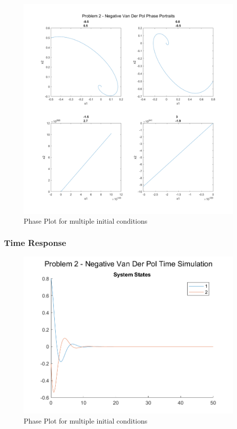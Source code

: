 \documentclass[letter]{article}
\begin{document}
\begin{figure}[h]
	\centering
	\includegraphics[width=1\linewidth]{fig/pblm2_phase_comparrision_neg}
	\caption{Phase Plot for multiple initial conditions}
	\label{fig:pblm2phasecomparrisionneg}
\end{figure}

\newpage
\subsubsection{Time Response}
\begin{figure}[h]
	\centering
	\includegraphics[width=0.8\linewidth]{fig/pblm2_vs_time_neg}
	\caption{Phase Plot for multiple initial conditions}
	\label{fig:pblm2vstimeneg}
\end{figure}
\end{document}
